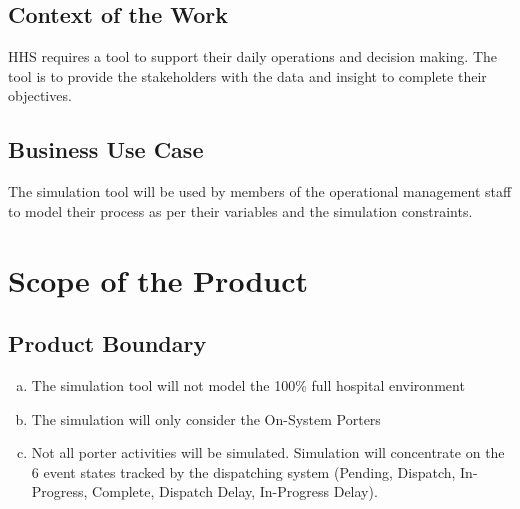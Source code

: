 \documentclass[paper=letter, fontsize=10pt]{scrartcl}
\numberwithin{equation}{section}		%
\numberwithin{figure}{section}			%
\numberwithin{table}{section}				%
\begin{document}
\subsection{Context of the Work}
HHS requires a tool to support their daily operations and decision making. The tool is to provide the stakeholders with the data and insight to complete their objectives.
\subsection{Business Use Case}
The simulation tool will be used by members of the operational management staff to model their process as per their variables and the simulation constraints.

\section{Scope of the Product}
\subsection{Product Boundary}
\begin{enumerate}[(a)]
	\item The simulation tool will not model the 100\% full hospital environment
	\item The simulation will only consider the On-System Porters
	\item Not all porter activities will be simulated. Simulation will concentrate on the 6 event states tracked by the dispatching system (Pending, Dispatch, In-Progress, Complete, Dispatch Delay, In-Progress Delay).
\end{enumerate} 
\end{document}
